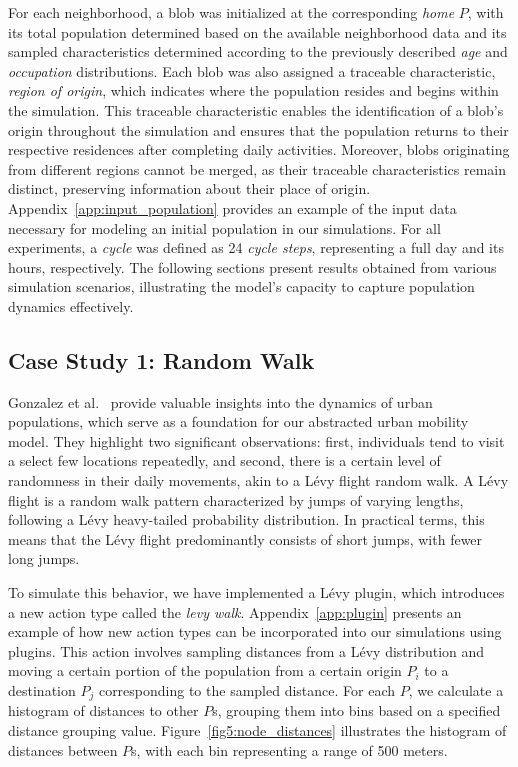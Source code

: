 \documentclass[pdflatex,sn-mathphys-num]{sn-jnl}%
\theoremstyle{thmstyleone}%
\theoremstyle{thmstyletwo}%
\theoremstyle{thmstylethree}%
\begin{document}
For each neighborhood, a blob was initialized at the corresponding \textit{home} $P$, with its total population determined based on the available neighborhood data and its sampled characteristics determined according to the previously described \textit{age} and \textit{occupation} distributions.
Each blob was also assigned a traceable characteristic, \textit{region of origin}, which indicates where the population resides and begins within the simulation. This traceable characteristic enables the identification of a blob's origin throughout the simulation and ensures that the population returns to their respective residences after completing daily activities. Moreover, blobs originating from different regions cannot be merged, as their traceable characteristics remain distinct, preserving information about their place of origin.
Appendix~\ref{app:input_population} provides an example of the input data necessary for modeling an initial population in our simulations.
For all experiments, a \textit{cycle} was defined as 24 \textit{cycle steps}, representing a full day and its hours, respectively. The following sections present results obtained from various simulation scenarios, illustrating the model's capacity to capture population dynamics effectively.


\subsection{Case Study 1: Random Walk}
\label{sec:random_walk}

Gonzalez et al.~\citep{gonzalez2008understanding} provide valuable insights into the dynamics of urban populations, which serve as a foundation for our abstracted urban mobility model. They highlight two significant observations: first, individuals tend to visit a select few locations repeatedly, and second, there is a certain level of randomness in their daily movements, akin to a Lévy flight random walk.
A Lévy flight is a random walk pattern characterized by jumps of varying lengths, following a Lévy heavy-tailed probability distribution. In practical terms, this means that the Lévy flight predominantly consists of short jumps, with fewer long jumps.

To simulate this behavior, we have implemented a Lévy plugin, which introduces a new action type called the \textit{levy walk}. Appendix~\ref{app:plugin} presents an example of how new action types can be incorporated into our simulations using plugins. This action involves sampling distances from a Lévy distribution and moving a certain portion of the population from a certain origin $P_i$ to a destination $P_j$ corresponding to the sampled distance.
For each $P$, we calculate a histogram of distances to other $P$s, grouping them into bins based on a specified distance grouping value. Figure~\ref{fig5:node_distances} illustrates the histogram of distances between $P$s, with each bin representing a range of 500 meters.
\end{document}
